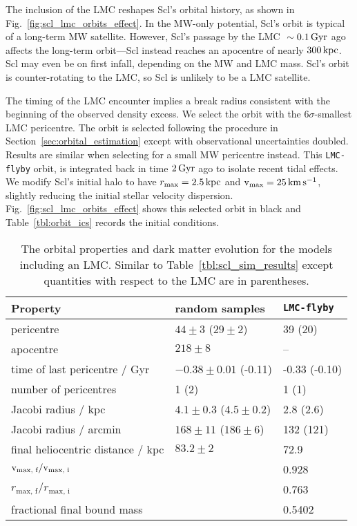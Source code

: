 The inclusion of the LMC reshapes Scl's orbital history, as shown in
Fig.~\ref{fig:scl_lmc_orbits_effect}. In the MW-only potential, Scl's
orbit is typical of a long-term MW satellite. However, Scl's passage by
the LMC \(~\sim0.1\,{\rm Gyr}\) ago affects the long-term orbit---Scl instead
reaches an apocentre of nearly \(300\,{\rm kpc}\). Scl may even be on first
infall, depending on the MW and LMC mass. Scl's orbit is
counter-rotating to the LMC, so Scl is unlikely to be a LMC satellite.

The timing of the LMC encounter implies a break radius consistent with
the beginning of the observed density excess. We select the orbit with
the \(6\sigma\)-smallest LMC pericentre. The orbit is selected following
the procedure in Section~\ref{sec:orbital_estimation} except with
observational uncertainties doubled. Results are similar when selecting
for a small MW pericentre instead. This \texttt{LMC-flyby} orbit, is
integrated back in time \(2\,{\rm Gyr}\) ago to isolate recent tidal effects.
We modify Scl's initial halo to have \(r_{\rm max} = 2.5\,{\rm kpc}\) and
\({\rm v}_{\rm max} = 25\,{\rm km\,s^{-1}}\), slightly reducing the initial stellar velocity
dispersion. Fig.~\ref{fig:scl_lmc_orbits_effect} shows this selected
orbit in black and Table~\ref{tbl:orbit_ics} records the initial
conditions.

\begin{table*}[t]
\centering
\caption[Orbits and results for Scl in the LMC potential.]{The orbital properties and dark matter evolution for the models including an LMC. Similar to Table \ref{tbl:scl_sim_results} except quantities with respect to the LMC are in parentheses. }
\label{tbl:scl_lmc_sims}
\begin{tabular}{lll}
\toprule
Property & random samples & \texttt{LMC-flyby}\\
\midrule
pericentre & $44\pm 3$ ($29 \pm 2$) & 39 (20)\\
apocentre & $218 \pm 8$ & –\\
time of last pericentre / Gyr & $-0.38\pm0.01$ (-0.11) & -0.33 (-0.10)\\
number of pericentres & 1 (2) & 1 (1)\\
Jacobi radius / kpc & $4.1\pm0.3$ ($4.5\pm0.2$) & 2.8 (2.6)\\
Jacobi radius / arcmin & $168 \pm 11$ ($186\pm6$) & 132 (121)\\
final heliocentric distance / kpc & $83.2\pm2$ & 72.9\\
${\rm v}_\textrm{max, f} / {\rm v}_\textrm{max, i}$ &  & 0.928\\
$r_\textrm{max, f} / r_\textrm{max, i}$ &  & 0.763\\
fractional final bound mass &  & 0.5402\\
\bottomrule
\end{tabular}
\end{table*}

